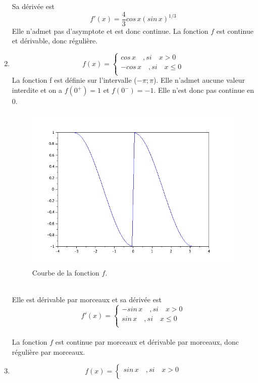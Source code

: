 \documentclass[a4paper,12pt]{report}
\begin{document}
\begin{enumerate}
	Sa d\'eriv\'ee est $$f'(x)=\frac{4}{3} cos\,x (sin\,x)^{1/3}$$ Elle n'admet pas d'asymptote et est donc continue.
	La fonction $f$ est continue et d\'erivable, donc r\'eguli\`ere.
	\newpage
	\item \[f(x)=
  \left\{
      \begin{aligned}
        cos\,x\quad , si\quad x > 0\\
        -cos\,x\quad ,si\quad x \le 0\\
      \end{aligned}
    \right.\]
	La fonction f est d\'efinie sur l'intervalle ($-\pi;\pi$). Elle n'admet aucune valeur interdite et on a $f(0^+)=1$ et $f(0^-)=-1$. Elle n'est donc pas continue en 0.
	\begin{figure}[h!]
		\centering
		\includegraphics[scale=0.6]{ex2_fig3.png}
		\caption{\label{figure3}Courbe de la fonction $f$.}
		\end{figure}
		\\
	Elle est d\'erivable par morceaux et sa d\'eriv\'ee est \[f'(x)=
  \left\{
      \begin{aligned}
        -sin\,x\quad , si\quad x > 0\\
        sin\,x\quad ,si\quad x \le 0\\
      \end{aligned}
    \right.\] \\
	La fonction $f$ est continue par morceaux et d\'erivable par morceaux, donc r\'eguli\`ere par morceaux.
	\newpage
	\item \[f(x)=
  \left\{
      \begin{aligned}
        sin\,x\quad , si\quad x > 0\\

\end{aligned}\]
\end{enumerate}
\end{document}
